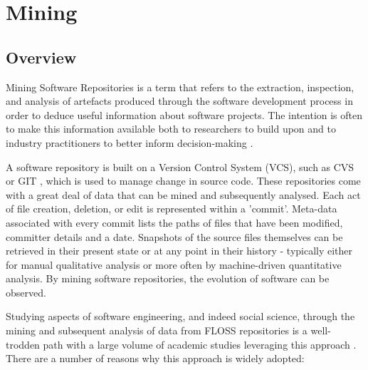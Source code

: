 \section{Mining} %
\subsection{Overview}
Mining Software Repositories is a term that refers to the extraction, inspection, and analysis of artefacts produced through the software development process in order to deduce useful information about software projects. The intention is often to make this information available both to researchers to build upon and to industry practitioners to better inform decision-making \cite{hassan2008road}.

A software repository is built on a Version Control System (VCS), such as CVS \cite{cvs} or GIT \cite{git}, which is used to manage change in source code. These repositories come with a great deal of data that can be mined and subsequently analysed. Each act of file creation, deletion, or edit is represented within a 'commit'. Meta-data associated with every commit lists the paths of files that have been modified, committer details and a date. Snapshots of the source files themselves can be retrieved in their present state or at any point in their history - typically either for manual qualitative analysis or more often by machine-driven quantitative analysis. By mining software repositories, the evolution of software can be observed. 

Studying aspects of software engineering, and indeed social science, through the mining and subsequent analysis of data from FLOSS repositories is a well-trodden path with a large volume of academic studies leveraging this approach \cite{hassan2008road}\cite{hemmati2013msr}. There are a number of reasons why this approach is widely adopted:

